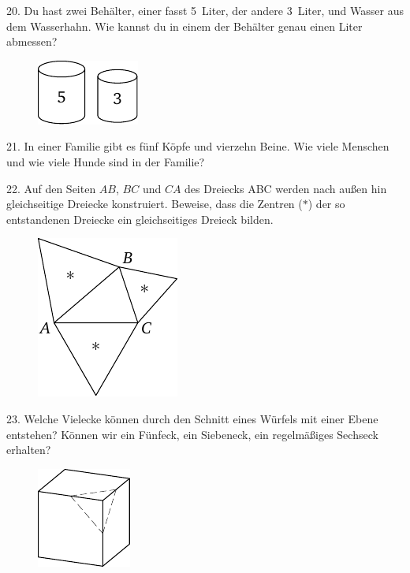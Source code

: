 \begin{problem}{20.}
	Du hast zwei Behälter, einer fasst 5~Liter, der andere 3~Liter, und Wasser aus dem Wasserhahn. Wie kannst du in einem der Behälter genau einen Liter abmessen?
	\begin{figure}
		\includegraphics{resources/taskbook-4}
	\end{figure}
\end{problem}

\begin{problem}{21.}
	In einer Familie gibt es fünf Köpfe und vierzehn Beine. Wie viele Menschen und wie viele Hunde sind in der Familie?
\end{problem}

\begin{problem}{22.}
	Auf den Seiten $AB$, $BC$ und $CA$ des Dreiecks ABC werden nach außen hin gleichseitige Dreiecke konstruiert. Beweise, dass die Zentren ($*$) der so entstandenen Dreiecke ein gleichseitiges Dreieck bilden.
	\begin{figure}
		\includegraphics{resources/taskbook-6}
	\end{figure}
\end{problem}

\begin{problem}{23.}
	Welche Vielecke können durch den Schnitt eines Würfels mit einer Ebene entstehen? Können wir ein Fünfeck, ein Siebeneck, ein regelmäßiges Sechseck erhalten?
	\begin{figure}
		\includegraphics{resources/taskbook-7}
	\end{figure}
\end{problem}

